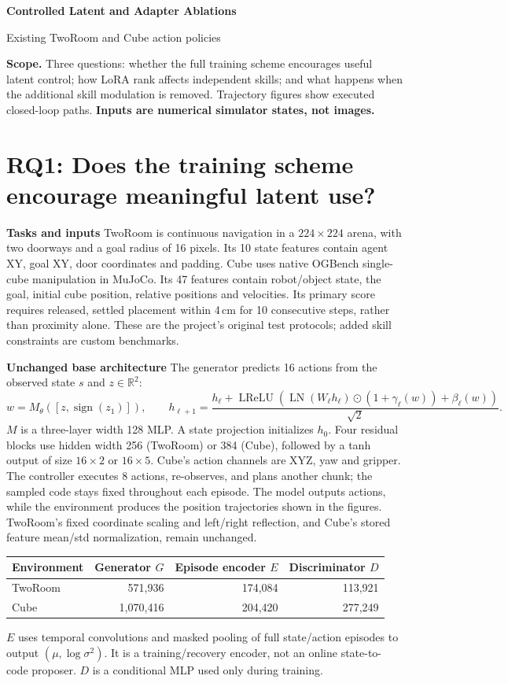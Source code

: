 \documentclass[11pt,a4paper]{article}
\newcommand{\topic}[1]{\par\smallskip\textbf{#1}\quad}
\begin{document}
\fontsize{10}{12}\selectfont
\begin{center}{\LARGE\bfseries\color{ink}Controlled Latent and Adapter Ablations\par}
{\large Existing TwoRoom and Cube action policies\par}\end{center}
\textbf{Scope.} Three questions: whether the full training scheme encourages useful
latent control; how LoRA rank affects independent skills; and what happens when
the additional skill modulation is removed. Trajectory figures show executed
closed-loop paths. \textbf{Inputs are numerical simulator states, not images.}

\section{RQ1: Does the training scheme encourage meaningful latent use?}
\topic{Tasks and inputs}
TwoRoom is continuous navigation in a $224\times224$ arena, with two doorways
and a goal radius of 16 pixels. Its 10 state features contain agent XY, goal XY,
door coordinates and padding. Cube uses native OGBench single-cube manipulation
in MuJoCo. Its 47 features contain robot/object state, the goal, initial cube
position, relative positions and velocities. Its primary score requires released,
settled placement within 4\,cm for 10 consecutive steps, rather than proximity alone. These are the project's original
test protocols; added skill constraints are custom benchmarks.

\topic{Unchanged base architecture}
The generator predicts 16 actions from the observed state $s$ and $z\in\mathbb R^2$:
\[
 w=M_\theta([z,\operatorname{sign}(z_1)]),\qquad
 h_{\ell+1}=\frac{h_\ell+\operatorname{LReLU}\!\left(
 \operatorname{LN}(W_\ell h_\ell)\odot(1+\gamma_\ell(w))+\beta_\ell(w)\right)}{\sqrt2}.
\]
$M$ is a three-layer width 128 MLP. A state projection initializes $h_0$. Four residual blocks use hidden width 256
(TwoRoom) or 384 (Cube), followed by a tanh output of size $16\times2$ or
$16\times5$. Cube's action channels are XYZ, yaw and gripper.
The controller executes 8 actions, re-observes, and plans another chunk;
the sampled code stays fixed throughout each episode. The model outputs actions,
while the environment produces the position trajectories shown in the figures.
TwoRoom's fixed coordinate scaling and left/right reflection, and Cube's stored
feature mean/std normalization, remain unchanged.

\begin{center}\begin{tabular}{lrrr}\toprule
Environment & Generator $G$ & Episode encoder $E$ & Discriminator $D$\\\midrule
TwoRoom &571,936&174,084&113,921\\
Cube &1,070,416&204,420&277,249\\\bottomrule
\end{tabular}\end{center}
$E$ uses temporal convolutions and masked pooling of full state/action episodes
to output $(\mu,\log\sigma^2)$. It is a training/recovery encoder, not an online
state-to-code proposer. $D$ is a conditional MLP used only during training.
\end{document}
